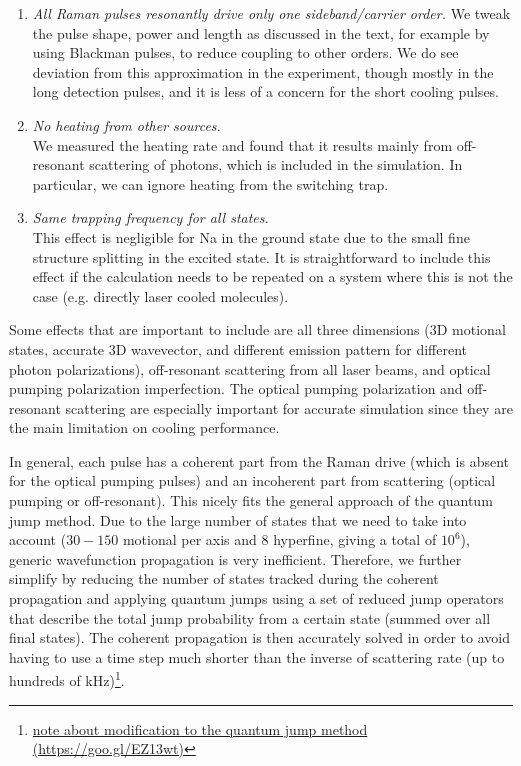 \documentclass[aps,secnumarabic,amsmath,amssymb]{revtex4}
\begin{document}
\begin{enumerate}
\item \emph{All Raman pulses resonantly drive only one sideband/carrier order.}  We tweak the pulse shape, power and length as discussed in the text, for example by using Blackman pulses, to reduce coupling to other orders. We do see deviation from this approximation in the experiment, though mostly in the long detection pulses, and it is less of a concern for the short cooling pulses.
\item \emph{No heating from other sources.}\\
  We measured the heating rate and found that it results mainly from off-resonant scattering
  of photons, which is included in the simulation.  In particular, we can ignore heating from the switching trap.
\item \emph{Same trapping frequency for all states.}\\
  This effect is negligible for Na in the ground state due to the small fine structure splitting in the excited state.
  It is straightforward to include this effect if the calculation needs to be repeated
  on a system where this is not the case (e.g. directly laser cooled molecules).
\end{enumerate}

Some effects that are important to include are all three dimensions (3D motional states,
accurate 3D wavevector, and different emission pattern for different photon polarizations),
off-resonant scattering from all laser beams, and optical pumping polarization imperfection.
The optical pumping polarization and off-resonant scattering are especially important
for accurate simulation since they are the main limitation on cooling performance.

In general, each pulse has a coherent part from the Raman drive
(which is absent for the optical pumping pulses)
and an incoherent part from scattering (optical pumping or off-resonant).
This nicely fits the general approach of the quantum jump method.
Due to the large number of states that we need to take into account
($30-150$ motional per axis and $8$ hyperfine, giving a total of $10^6$),
generic wavefunction propagation is very inefficient.
Therefore, we further simplify by reducing the number of states tracked during
the coherent propagation and applying quantum jumps using a set of reduced jump operators that
describe the total jump probability from a certain state (summed over all final states).
The coherent propagation is then accurately solved in order to avoid having to use a time step
much shorter than the inverse of scattering rate (up to hundreds of kHz)\footnote{\href{https://goo.gl/EZ13wt}{note about modification to the quantum jump method (https://goo.gl/EZ13wt)}}.
\end{document}
